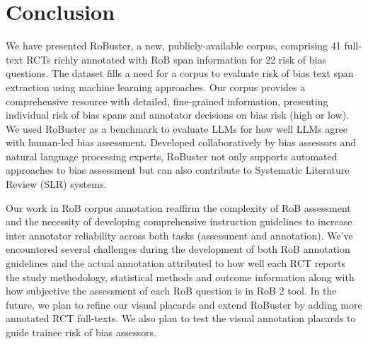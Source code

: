 \documentclass[sn-mathphys,Numbered]{sn-jnl}%
\theoremstyle{thmstyleone}%
\theoremstyle{thmstyletwo}%
\theoremstyle{thmstylethree}%
\begin{document}
\section{Conclusion}
\label{sec:conclusion}
%
We have presented RoBuster, a new, publicly-available corpus, comprising 41 full-text RCTs richly annotated with RoB span information for 22 risk of bias questions.
The dataset fills a need for a corpus to evaluate risk of bias text span extraction using machine learning approaches.
Our corpus provides a comprehensive resource with detailed, fine-grained information, presenting individual risk of bias spans and annotator decisions on bias risk (high or low). 
We used RoBuster as a benchmark to evaluate LLMs for how well LLMs agree with human-led bias assessment.
Developed collaboratively by bias assessors and natural language processing experts, RoBuster not only supports automated approaches to bias assessment but can also contribute to Systematic Literature Review (SLR) systems.


Our work in RoB corpus annotation reaffirm the complexity of RoB assessment and the necessity of developing comprehensive instruction guidelines to increase inter annotator reliability across both tasks (assessment and annotation).
We've encountered several challenges during the development of both RoB annotation guidelines and the actual annotation attributed to how well each RCT reports the study methodology, statistical methods and outcome information along with how subjective the assessment of each RoB question is in RoB 2 tool.
In the future, we plan to refine our visual placards and extend RoBuster by adding more annotated RCT full-texts.
We also plan to test the visual annotation placards to guide trainee risk of bias assessors.
%
%
%
\end{document}
